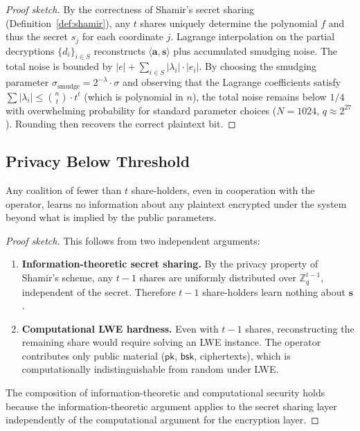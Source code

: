 \begin{proof}[Proof sketch]
By the correctness of Shamir's secret sharing
(Definition~\ref{def:shamir}), any $t$ shares uniquely determine the
polynomial $f$ and thus the secret $s_j$ for each coordinate $j$.
Lagrange interpolation on the partial decryptions $\{d_i\}_{i \in S}$
reconstructs $\langle \mathbf{a}, \mathbf{s} \rangle$ plus accumulated
smudging noise.  The total noise is bounded by $|e| + \sum_{i \in S}
|\lambda_i| \cdot |e_i|$.  By choosing the smudging parameter
$\sigma_{\text{smudge}} = 2^{-\lambda} \cdot \sigma$ and observing that
the Lagrange coefficients satisfy $\sum |\lambda_i| \leq \binom{n}{t}
\cdot t^t$ (which is polynomial in $n$), the total noise remains below
$1/4$ with overwhelming probability for standard parameter choices
($N = 1024$, $q \approx 2^{27}$).  Rounding then recovers the correct
plaintext bit.
\end{proof}

\subsection{Privacy Below Threshold}

\begin{theorem}
\label{thm:privacy}
Any coalition of fewer than $t$ share-holders, even in cooperation with
the operator, learns no information about any plaintext encrypted under
the system beyond what is implied by the public parameters.
\end{theorem}

\begin{proof}[Proof sketch]
This follows from two independent arguments:
\begin{enumerate}[nosep]
  \item \textbf{Information-theoretic secret sharing.}  By the privacy
        property of Shamir's scheme, any $t-1$ shares are uniformly
        distributed over $\mathbb{Z}_q^{t-1}$, independent of the secret.
        Therefore $t-1$ share-holders learn nothing about $\mathbf{s}$.
  \item \textbf{Computational LWE hardness.}  Even with $t-1$ shares,
        reconstructing the remaining share would require solving an LWE
        instance.  The operator contributes only public material
        ($\mathsf{pk}$, $\mathsf{bsk}$, ciphertexts), which is
        computationally indistinguishable from random under LWE.
\end{enumerate}
The composition of information-theoretic and computational security
holds because the information-theoretic argument applies to the secret
sharing layer independently of the computational argument for the
encryption layer.
\end{proof}


